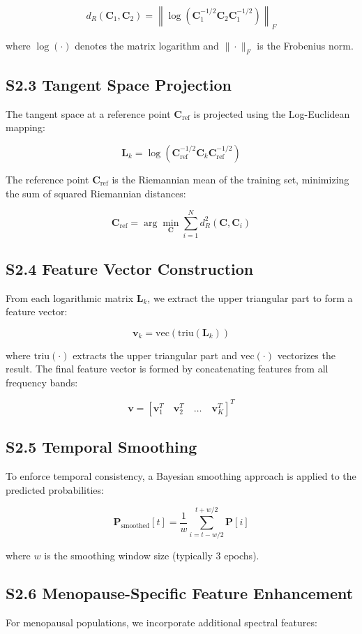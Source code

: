 \documentclass[ASNA,twocolumn]{USG}
\begin{document}
\[
d_R(\mathbf{C}_1, \mathbf{C}_2) = \left\| \log\left( \mathbf{C}_1^{-1/2} \mathbf{C}_2 \mathbf{C}_1^{-1/2} \right) \right\|_F
\]

where $\log(\cdot)$ denotes the matrix logarithm and $\|\cdot\|_F$ is the Frobenius norm.

\subsection*{S2.3 Tangent Space Projection}
The tangent space at a reference point $\mathbf{C}_{\text{ref}}$ is projected using the Log-Euclidean mapping:

\[
\mathbf{L}_k = \log\left( \mathbf{C}_{\text{ref}}^{-1/2} \mathbf{C}_k \mathbf{C}_{\text{ref}}^{-1/2} \right)
\]

The reference point $\mathbf{C}_{\text{ref}}$ is the Riemannian mean of the training set, minimizing the sum of squared Riemannian distances:

\[
\mathbf{C}_{\text{ref}} = \arg\min_{\mathbf{C}} \sum_{i=1}^{N} d_R^2(\mathbf{C}, \mathbf{C}_i)
\]

\subsection*{S2.4 Feature Vector Construction}
From each logarithmic matrix $\mathbf{L}_k$, we extract the upper triangular part to form a feature vector:

\[
\mathbf{v}_k = \text{vec}(\text{triu}(\mathbf{L}_k))
\]

where $\text{triu}(\cdot)$ extracts the upper triangular part and $\text{vec}(\cdot)$ vectorizes the result. The final feature vector is formed by concatenating features from all frequency bands:

\[
\mathbf{v} = \left[ \mathbf{v}_1^T \quad \mathbf{v}_2^T \quad \dots \quad \mathbf{v}_K^T \right]^T
\]

\subsection*{S2.5 Temporal Smoothing}
To enforce temporal consistency, a Bayesian smoothing approach is applied to the predicted probabilities:

\[
\mathbf{P}_{\text{smoothed}}[t] = \frac{1}{w} \sum_{i=t-w/2}^{t+w/2} \mathbf{P}[i]
\]

where $w$ is the smoothing window size (typically 3 epochs).

\subsection*{S2.6 Menopause-Specific Feature Enhancement}
For menopausal populations, we incorporate additional spectral features:
\end{document}
